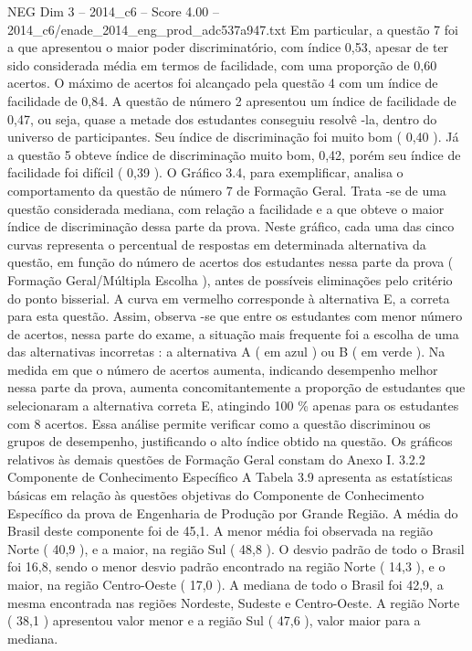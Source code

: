 \begin{textsample}{NEG Dim 3 – 2014\_c6 – Score 4.00 – 2014\_c6/enade\_2014\_eng\_prod\_adc537a947.txt}
Em particular, a questão 7 foi a que apresentou o maior poder discriminatório, com índice 0,53, apesar de ter sido considerada média em termos de facilidade, com uma proporção de 0,60 acertos.
O máximo de acertos foi alcançado pela questão 4 com um índice de facilidade de 0,84.
A questão de número 2 apresentou um índice de facilidade de 0,47, ou seja, quase a metade dos estudantes conseguiu resolvê -la, dentro do universo de participantes.
Seu índice de discriminação foi muito bom ( 0,40 ).
Já a questão 5 obteve índice de discriminação muito bom, 0,42, porém seu índice de facilidade foi difícil ( 0,39 ).
O Gráfico 3.4, para exemplificar, analisa o comportamento da questão de número 7 de Formação Geral.
Trata -se de uma questão considerada mediana, com relação a facilidade e a que obteve o maior índice de discriminação dessa parte da prova.
Neste gráfico, cada uma das cinco curvas representa o percentual de respostas em determinada alternativa da questão, em função do número de acertos dos estudantes nessa parte da prova ( Formação Geral/Múltipla Escolha ), antes de possíveis eliminações pelo critério do ponto bisserial.
A curva em vermelho corresponde à alternativa E, a correta para esta questão.
Assim, observa -se que entre os estudantes com menor número de acertos, nessa parte do exame, a situação mais frequente foi a escolha de uma das alternativas incorretas : a alternativa A ( em azul ) ou B ( em verde ).
Na medida em que o número de acertos aumenta, indicando desempenho melhor nessa parte da prova, aumenta concomitantemente a proporção de estudantes que selecionaram a alternativa correta E, atingindo 100 \% apenas para os estudantes com 8 acertos.
Essa análise permite verificar como a questão discriminou os grupos de desempenho, justificando o alto índice obtido na questão.
Os gráficos relativos às demais questões de Formação Geral constam do Anexo I. 3.2.2 Componente de Conhecimento Específico A Tabela 3.9 apresenta as estatísticas básicas em relação às questões objetivas do Componente de Conhecimento Específico da prova de Engenharia de Produção por Grande Região.
A média do Brasil deste componente foi de 45,1.
A menor média foi observada na região Norte ( 40,9 ), e a maior, na região Sul ( 48,8 ).
O desvio padrão de todo o Brasil foi 16,8, sendo o menor desvio padrão encontrado na região Norte ( 14,3 ), e o maior, na região Centro-Oeste ( 17,0 ).
A mediana de todo o Brasil foi 42,9, a mesma encontrada nas regiões Nordeste, Sudeste e Centro-Oeste.
A região Norte ( 38,1 ) apresentou valor menor e a região Sul ( 47,6 ), valor maior para a mediana.

\end{textsample}
